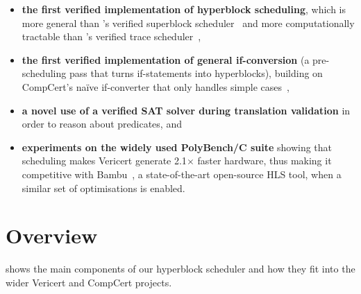 \begin{itemize}
\item \textbf{the first verified implementation of hyperblock scheduling}, which
  is more general than \citeauthor{six22_formal_verif_super_sched}'s verified
  superblock scheduler~\cite{six22_formal_verif_super_sched} and more
  computationally tractable than
  \citeauthor{tristan08_formal_verif_trans_valid}'s verified trace
  scheduler~\cite{tristan08_formal_verif_trans_valid},
\item \textbf{the first verified implementation of general if-conversion} (a
  pre-scheduling pass that turns if-statements into hyperblocks), building on
  CompCert's na\"ive if-converter that only handles simple
  cases~\cite{absint19_compc},
\item \textbf{a novel use of a verified SAT solver during translation
    validation} in order to reason about predicates, and
\item \textbf{experiments on the widely used PolyBench/C suite} showing that
  scheduling makes Vericert generate 2.1$\times$ faster hardware, thus making it
  competitive with Bambu~\cite{ferrandi21_bambu}, a state-of-the-art
  open-source HLS tool, when a similar set of optimisations is enabled.
\end{itemize}

\section{Overview}
\label{sec:hs:overview}

 shows the main components of our hyperblock scheduler
and how they fit into the wider Vericert and CompCert projects.



